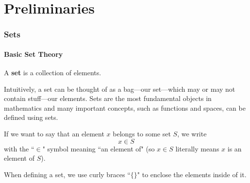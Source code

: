 \part{Preliminaries}

\section{Sets}

\subsection{Basic Set Theory}

\begin{defbox}
   A \textbf{set} is a collection of elements.
\end{defbox}

Intuitively, a set can be thought of as a bag---our set---which may or may not contain stuff---our elements. Sets are the most fundamental objects in mathematics and many important concepts, such as functions and spaces, can be defined using sets.

If we want to say that an element $x$ belongs to some set $S$, we write
\[x \in S\]
with the ``$\in$" symbol meaning ``an element of" (so $x \in S$ literally means $x$ is an element of $S$). 

When defining a set, we use curly braces ``$\{\}$" to enclose the elements inside of it.

